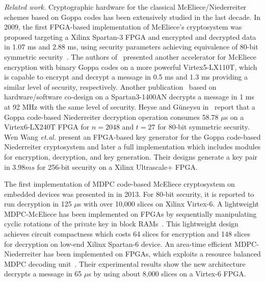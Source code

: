 \documentclass[runningheads]{llncs}
\begin{document}
\textit{Related work.} Cryptographic hardware for the classical McEliece/Niederreiter schemes based on Goppa
codes has been extensively studied in the last decade. In 2009, the first FPGA-based implementation of McEliece's cryptosystem was proposed targeting
a Xilinx Spartan-3 FPGA and encrypted and decrypted data in 1.07 ms and 2.88 ms, using
security parameters achieving equivalence of 80-bit symmetric security~\cite{eisenbarth2009microeliece}.
The authors of~\cite{shoufan2010novel} presented another accelerator for McEliece encryption with binary Goppa codes on a more powerful Virtex5-LX110T, which is capable to encrypt and decrypt a message in 0.5 ms and 1.3 ms providing a similar level of security, respectively. Another publication~\cite{ghosh2012speed} based on
hardware/software co-design on a Spartan3-1400AN decrypts a message in 1 ms at 92 MHz with
the same level of security. Heyse and G\"uneysu in~\cite{heyse2012towards} report that a Goppa code-based Niederreiter decryption operation consumes 58.78 $\mu$s on a Virtex6-LX240T FPGA for $n = 2048$ and $t = 27$ for 80-bit symmetric security.  Wen Wang \textit{et.al.} present an FPGA-based key generator for the Goppa code-based Niederreiter cryptosystem \cite{wang2017fpga} and later a full implementation \cite{wang2018fpga} which includes modules for encryption, decryption, and key generation. Their designs generate a key pair in $3.98 ms$ for 256-bit security on a Xilinx Ultrascale+ FPGA.

The first implementation of MDPC code-based McEliece cryptosystem on embedded devices was presented in \cite{heyse2013smaller} in 2013. For 80-bit security, it is reported to run decryption in 125 $\mu$s with over 10,000 slices on Xilinx Virtex-6. A lightweight MDPC-McEliece has been implemented on FPGAs by sequentially manipulating cyclic rotations of the private key in block RAMs~\cite{von2014lightweight}. This lightweight design achieves circuit compactness which costs 64 slices for encryption and 148 slices for decryption on low-end Xilinx Spartan-6 device. An area-time efficient MDPC-Niederreiter has been implemented on FPGAs, which exploits a resource balanced MDPC decoding unit~\cite{hu2017area}. Their experimental results show the new architecture decrypts a message in 65 $\mu$s by using about 8,000 slices on a Virtex-6 FPGA.
\end{document}
